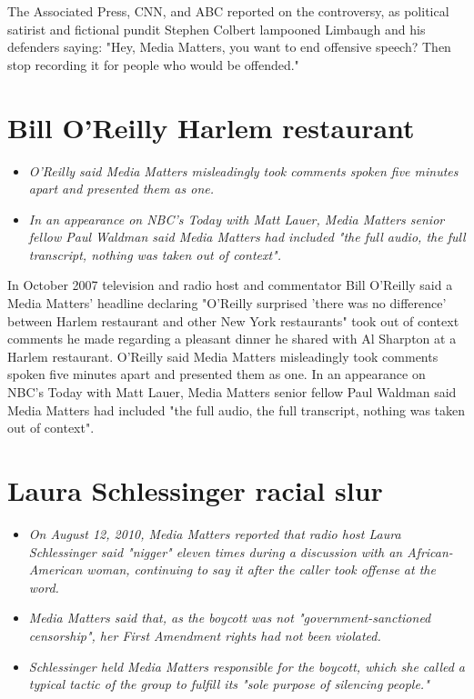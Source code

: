 The Associated Press, CNN, and ABC reported on the controversy, as
political satirist and fictional pundit Stephen Colbert lampooned
Limbaugh and his defenders saying: "Hey, Media Matters, you want to end
offensive speech? Then stop recording it for people who would be
offended."

\section{Bill O'Reilly Harlem
restaurant}\label{bill-oreilly-harlem-restaurant}

\begin{itemize}
\item
  \emph{O'Reilly said Media Matters misleadingly took comments spoken
  five minutes apart and presented them as one.}
\item
  \emph{In an appearance on NBC's Today with Matt Lauer, Media Matters
  senior fellow Paul Waldman said Media Matters had included "the full
  audio, the full transcript, nothing was taken out of context".}
\end{itemize}

In October 2007 television and radio host and commentator Bill O'Reilly
said a Media Matters' headline declaring "O'Reilly surprised 'there was
no difference' between Harlem restaurant and other New York restaurants"
took out of context comments he made regarding a pleasant dinner he
shared with Al Sharpton at a Harlem restaurant. O'Reilly said Media
Matters misleadingly took comments spoken five minutes apart and
presented them as one. In an appearance on NBC's Today with Matt Lauer,
Media Matters senior fellow Paul Waldman said Media Matters had included
"the full audio, the full transcript, nothing was taken out of context".

\section{Laura Schlessinger racial
slur}\label{laura-schlessinger-racial-slur}

\begin{itemize}
\item
  \emph{On August 12, 2010, Media Matters reported that radio host Laura
  Schlessinger said "nigger" eleven times during a discussion with an
  African-American woman, continuing to say it after the caller took
  offense at the word.}
\item
  \emph{Media Matters said that, as the boycott was not
  "government-sanctioned censorship", her First Amendment rights had not
  been violated.}
\item
  \emph{Schlessinger held Media Matters responsible for the boycott,
  which she called a typical tactic of the group to fulfill its "sole
  purpose of silencing people."}
\end{itemize}

